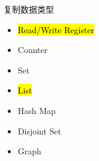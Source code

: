 \begin{frame}{}
  \begin{center}
    \begin{minipage}{0.50\textwidth}
      {\large 复制数据类型}  

      \vspace{0.20cm}
      \begin{itemize}
	\setlength{\itemsep}{4pt}
	\item \hl{Read/Write Register}
	\item Counter
	\item Set
	\item \hl{List}
	\item Hash Map
	\item Disjoint Set
	\item Graph
      \end{itemize}
    \end{minipage}
  \end{center}
\end{frame}

\begin{frame}{}
\end{frame}

% 
% 
